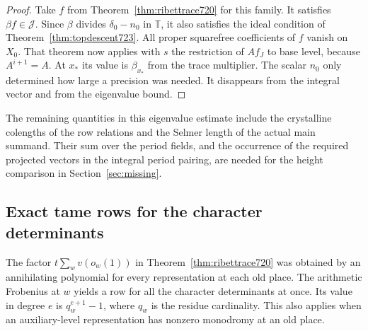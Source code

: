 \documentclass[a4paper,11pt]{article}
\theoremstyle{definition}
\theoremstyle{remark}
\numberwithin{equation}{section}
\begin{document}
\begin{proof}
Take \(f\) from Theorem~\ref{thm:ribettrace720} for this family.
It satisfies \(\beta f\in\mathcal J\). Since \(\beta\) divides
\(\delta_0-n_0\) in \(\mathbb T\), it also satisfies the
ideal condition of Theorem~\ref{thm:topdescent723}. All
proper squarefree coefficients of \(f\) vanish on \(X_0\).
That theorem now applies with \(s\) the restriction of \(Af_J\)
to base level, because \(A^{i+1}=A\). At \(x_*\) its value
is \(\beta_{x_*}\) from the trace multiplier. The scalar \(n_0\)
only determined how large a precision was needed. It disappears
from the integral vector and from the eigenvalue bound.
\end{proof}

The remaining quantities in this eigenvalue estimate include
the crystalline colengths of the row relations and the Selmer
length of the actual main summand. Their sum over the period
fields, and the occurrence of the required projected vectors
in the integral period pairing, are needed for the height
comparison in Section~\ref{sec:missing}.
\clearpage

\subsection{Exact tame rows for the character determinants}
\label{sec:tamerows725}

The factor \(t\sum_w v(o_w(1))\) in Theorem~\ref{thm:ribettrace720}
was obtained by an annihilating polynomial for every representation
at each old place. The arithmetic Frobenius at \(w\) yields a row for
all the character determinants at once. Its value in degree \(e\) is
\(q_w^{e+1}-1\), where \(q_w\) is the residue cardinality. This also
applies when an auxiliary-level representation has nonzero monodromy
at an old place.
\end{document}
